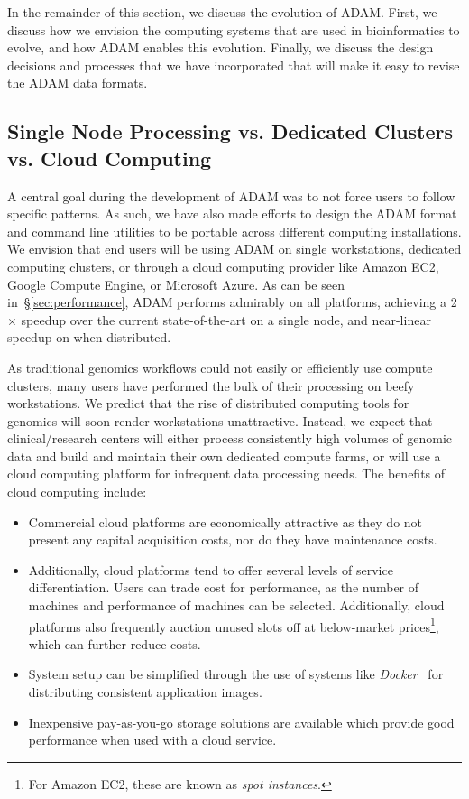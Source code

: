 \documentclass{bioinfo}
\begin{document}
In the remainder of this section, we discuss the evolution of ADAM. First, we discuss how we envision the computing systems that are used in bioinformatics to evolve, and
how ADAM enables this evolution. Finally, we discuss the design decisions and processes that we have incorporated that will make it easy to revise the ADAM data formats.

\subsection{Single Node Processing vs. Dedicated Clusters vs. Cloud Computing}
\label{sec:single-vs-clusters-vs-cloud}

A central goal during the development of ADAM was to not force users to follow specific patterns. As such, we have also made efforts to design the ADAM format and command
line utilities to be portable across different computing installations. We envision that end users will be using ADAM on single workstations, dedicated computing
clusters, or through a cloud computing provider like Amazon EC2, Google Compute Engine, or Microsoft Azure. As can be seen in~\S\ref{sec:performance}, ADAM performs
admirably on all platforms, achieving a 2$\times$ speedup over the current state-of-the-art on a single node, and near-linear speedup on when distributed.

As traditional genomics workflows could not easily or efficiently use compute clusters, many users have performed the bulk of their processing on beefy workstations. We predict
that the rise of distributed computing tools for genomics will soon render workstations unattractive. Instead, we expect that clinical/research centers will either process
consistently high volumes of genomic data and build and maintain their own dedicated compute farms, or will use a cloud computing platform for infrequent data processing
needs. The benefits of cloud computing include:

\begin{itemize}
\item Commercial cloud platforms are economically attractive as they do not present any capital acquisition costs, nor do they have maintenance costs.
\item Additionally, cloud platforms tend to offer several levels of service differentiation. Users can trade cost for performance, as the number of machines and performance of
machines can be selected. Additionally, cloud platforms also frequently auction unused slots off at below-market prices\footnote{For Amazon EC2, these are known as
\emph{spot instances}.}, which can further reduce costs.
\item System setup can be simplified through the use of systems like \textit{Docker}~\citep{docker} for distributing consistent application images.
\item Inexpensive pay-as-you-go storage solutions are available which provide good performance when used with a cloud service.
\end{itemize}
\end{document}
